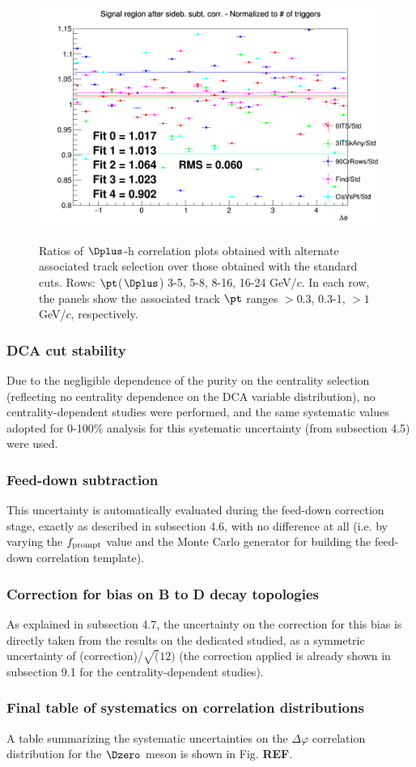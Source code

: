 \begin{figure}
{\includegraphics[width=0.31\linewidth]{Centrality_DPlus/Dplus/Systematic/60_100/Tracks_60_100/Ratio_AzimCorrDistr_Dplus_Canvas_PtIntBins11to11_PoolInt_thr1dotto99dot.png}} \\
 \caption{Ratios of $\Dplus$-h correlation plots obtained with alternate associated track selection over those obtained with the standard cuts. Rows: $\pt$($\Dplus$) 3-5, 5-8, 8-16, 16-24 GeV/$c$. In each row, the panels show the associated track
$\pt$ ranges $> 0.3$, 0.3-1, $> 1$ GeV/$c$, respectively.}
\label{fig:SysTrEff60100_Dplus}
\end{figure}

\subsubsection{DCA cut stability}
Due to the negligible dependence of the purity on the centrality selection (reflecting no centrality dependence on the DCA variable  distribution), no centrality-dependent studies were performed, and the same systematic values adopted for 0-100\% analysis for this systematic uncertainty (from subsection 4.5) were used.

\subsubsection{Feed-down subtraction}
This uncertainty is automatically evaluated during the feed-down correction stage, exactly as described in subsection 4.6, with no difference at all (i.e. by varying the $f_{\rm prompt}$ value and the Monte Carlo generator for building the feed-down correlation template).

\subsubsection{Correction for bias on B to D decay topologies}
As explained in subsection 4.7, the uncertainty on the correction for this bias is directly taken from the results on the dedicated studied, as a symmetric uncertainty of (correction)/$\sqrt(12)$ (the correction applied is already shown in subsection 9.1 for the centrality-dependent studies).

\subsubsection{Final table of systematics on correlation distributions}
A table summarizing the systematic uncertainties on the $\Delta\varphi$ correlation distribution for the $\Dzero$ meson is shown in Fig. {\bf REF}.

